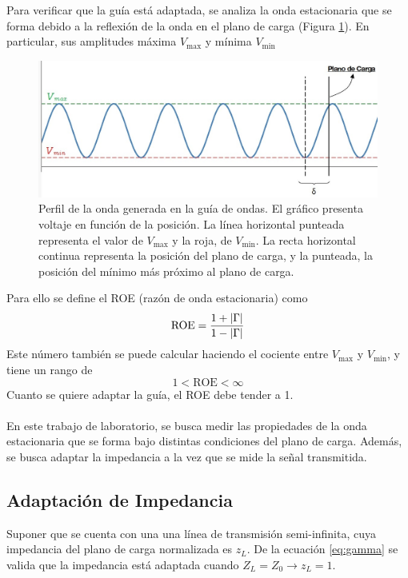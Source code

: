 \documentclass[11pt,a4paper]{article}
\DeclarePairedDelimiter\abs{\lvert}{\rvert}%
\begin{document}
\begin{multicols}{2}
Para verificar que la guía está adaptada, se analiza la onda estacionaria que se forma debido a la reflexión de la onda en el plano de carga (Figura \ref{fig:onda}).  En particular, sus amplitudes máxima $V_\text{max}$ y mínima $V_\text{min}$
\begin{figure}[H]
    \centering
    \includegraphics[width=0.9\linewidth]{Images/onda vmax.jpg}
    \caption{Perfil de la onda generada en la guía de ondas. El gráfico presenta voltaje en función de la posición. La línea horizontal punteada representa el valor de $V_\text{max}$ y la roja, de $V_\text{min}$. La recta horizontal continua representa la posición del plano de carga, y la punteada, la posición del mínimo más próximo al plano de carga.}
    \label{fig:onda}
\end{figure}
Para ello se define el ROE (razón de onda estacionaria) como
\begin{equation}
    \text{ROE} = \frac{1+\abs{\Gamma}}{1-\abs{\Gamma}}
\end{equation}
Este número también se puede calcular haciendo el cociente entre $V_\text{max}$ y $V_\text{min}$, y tiene un rango de 
$$
1<\text{ROE} < \infty
$$
Cuanto se quiere adaptar la guía, el ROE debe tender a 1. \\ \\
En este trabajo de laboratorio, se busca medir las propiedades de la onda estacionaria que se forma bajo distintas condiciones del plano de carga. Además, se busca adaptar la impedancia a la vez que se mide la señal transmitida. 
\subsection{Adaptación de Impedancia}

Suponer que se cuenta con una una línea de transmisión semi-infinita, cuya impedancia del plano de carga normalizada es $z_L$.
De la ecuación \ref{eq:gamma} se valida que la impedancia está adaptada cuando $Z_L = Z_0 \longrightarrow z_L = 1$.\\


\end{multicols}
\end{document}
